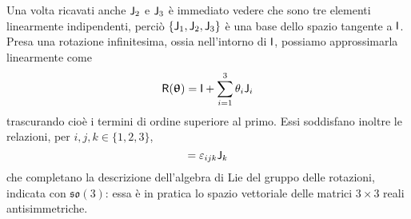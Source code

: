 Una volta ricavati anche $\mathsf{J}_2$ e $\mathsf{J}_3$ è immediato vedere che sono tre elementi linearmente indipendenti, perciò $\{\mathsf{J}_1,\mathsf{J}_2,\mathsf{J}_3\}$ è una base dello spazio tangente a $\mathsf{I}$.
Presa una rotazione infinitesima, ossia nell'intorno di $\mathsf{I}$, possiamo approssimarla linearmente come
\begin{equation}
	\mathsf{R}(\bm{\uptheta})=\mathsf{I}+\sum_{i=1}^3\theta_i\mathsf{J}_i
	\label{eq:rotazione-infinitesima}
\end{equation}
trascurando cioè i termini di ordine superiore al primo.
Essi soddisfano inoltre le relazioni, per $i,j,k\in\{1,2,3\}$,
\begin{equation}
	[\Ang_i,\Ang_j]=\epsilon_{ijk}\Ang_k
	\label{eq:parentesi-lie-so3}
\end{equation}
che completano la descrizione dell'algebra di Lie del gruppo delle rotazioni, indicata con $\mathfrak{so}(3)$: essa è in pratica lo spazio vettoriale delle matrici $3\times 3$ reali antisimmetriche.

